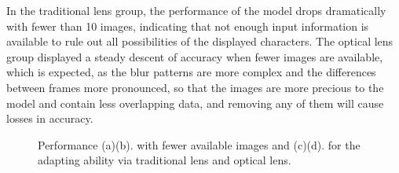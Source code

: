 In the traditional lens group, the performance of the model drops dramatically with fewer than 10 images, indicating that not enough input information is available to rule out all possibilities of the displayed characters. The optical lens group displayed a steady descent of accuracy when fewer images are available, which is expected, as the blur patterns are more complex and the differences between frames more pronounced, so that the images are more precious to the model and contain less overlapping data, and removing any of them will cause losses in accuracy.
\begin{figure}[!t]
    \centering
    \hfill
    \caption{Performance (a)(b). with fewer available images and (c)(d). for the adapting ability via traditional lens and optical lens.}
    \label{fig:number_adapting}
\end{figure}


